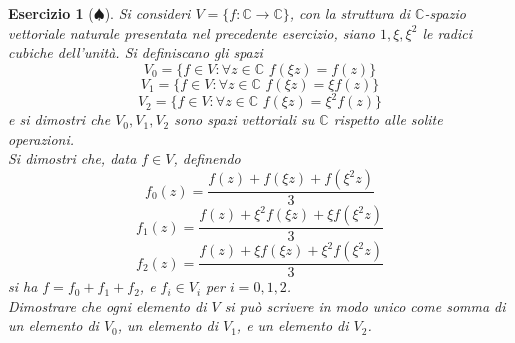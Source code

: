 \documentclass{article}
\newtheorem{es}{Esercizio}
\begin{document}
{\begin{es}[$\spadesuit$]
    Si consideri $V=\{f:\mathbb{C}\to \mathbb{C}\}$, con la struttura di $\mathbb{C}$-spazio vettoriale naturale presentata nel precedente esercizio, siano $1,\xi,\xi^2$ le radici cubiche dell'unità. Si definiscano gli spazi\\
    $$V_0=\{f\in V: \forall z\in \mathbb{C}\,\, f(\xi z)=f(z)\}$$
    $$V_1=\{f\in V: \forall z\in \mathbb{C}\,\, f(\xi z)=\xi f(z)\}$$
    $$V_2=\{f\in V: \forall z\in \mathbb{C}\,\, f(\xi z)=\xi^2 f(z)\}$$
    e si dimostri che $V_0,V_1,V_2$ sono spazi vettoriali su $\mathbb{C}$ rispetto alle solite operazioni.\\
    Si dimostri che, data $f\in V$, definendo 
    $$f_0(z)=\frac{f(z)+f(\xi z)+f(\xi^2 z)}{3}$$
    $$f_1(z)=\frac{f(z)+\xi^2f(\xi z)+\xi f(\xi^2 z)}{3}$$
    $$f_2(z)=\frac{f(z)+\xi f(\xi z)+\xi^2 f(\xi^2 z)}{3}$$
    si ha $f=f_0+f_1+f_2$, e $f_i\in V_i$ per $i=0,1,2$.\\
    Dimostrare che ogni elemento di $V$ si può scrivere in modo unico come somma di un elemento di $V_0$, un elemento di $V_1$, e un elemento di $V_2$.
    
\end{es}



\newpage
}
\end{document}
